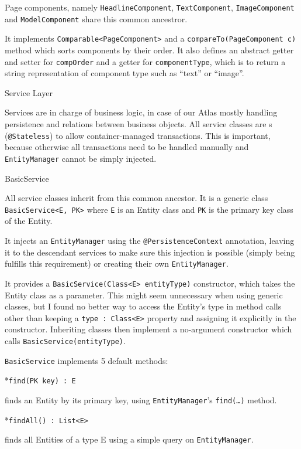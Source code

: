 Page components, namely {\tt HeadlineComponent}, {\tt TextComponent}, {\tt ImageComponent} and {\tt ModelComponent} share 
this common ancestror.

It implements {\tt Comparable<PageComponent>} and a {\tt compareTo(PageComponent c)} method which sorts components by their order. It also defines an abstract getter and setter for {\tt compOrder} and a getter for {\tt componentType}, which is to return a string representation of component type such as “text” or “image”.

\sec Service Layer

Services are in charge of business logic, in case of our Atlas mostly handling persistence and relations between business objects. All service classes are s ({\tt @Stateless}) to allow container-managed transactions. This is important, because otherwise all transactions need to be handled manually and  {\tt EntityManager} cannot be simply injected.

\secc BasicService

All service classes inherit from this common ancestor. It is a generic class {\tt BasicService<E, PK>} where {\tt E} is an Entity class and {\tt PK} is the primary key class of the Entity.

It injects an {\tt EntityManager} using the {\tt @PersistenceContext} annotation, leaving it to the descendant services to make sure this injection is possible (simply being  fulfills this requirement) or creating their own {\tt EntityManager}.

It provides a {\tt BasicService(Class<E> entityType)} constructor, which takes the Entity class as a parameter. This might seem unnecessary when using generic classes, but I found no better way to access the Entity’s type in method calls other than keeping a {\tt type : Class<E>} property and assigning it explicitly in the constructor. Inheriting classes then implement a no-argument constructor which calls {\tt BasicService(entityType)}.

{\tt BasicService} implements 5 default  methods:

\begitems

*{\tt find(PK key) : E}

finds an Entity by its primary key, using {\tt EntityManager}’s {\tt find(…)} method.

*{\tt findAll() : List<E>}

finds all Entities of a type {E} using a simple  query on {\tt EntityManager}.

